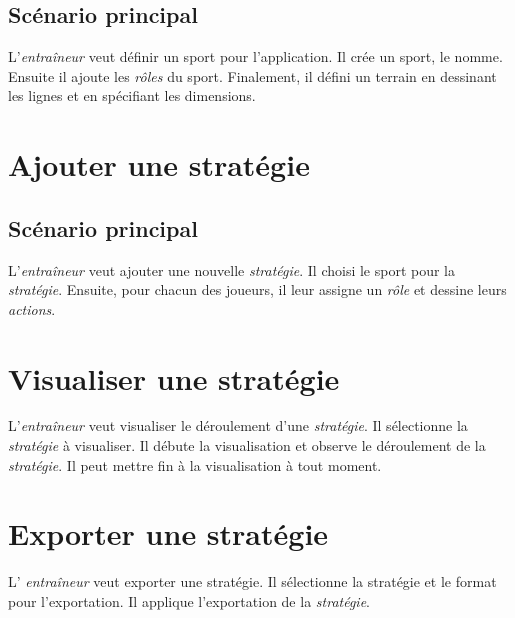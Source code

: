 \subsection{Sc\'enario principal}
\label{sub:sc'enario_principal}

L'\textit{entra\^ineur} veut définir un sport pour l'application.
Il cr\'ee un sport, le nomme.
Ensuite il ajoute les \textit{r\^oles} du sport.
Finalement, il d\'efini un terrain en dessinant les lignes et en sp\'ecifiant les dimensions.

\section{Ajouter une stratégie}
\label{sec:ajouter_une_strategie}

\subsection{Sc\'enario principal}
\label{sub:sc'enario_principal}

L'\textit{entraîneur} veut ajouter une nouvelle \textit{stratégie}.
Il choisi le sport pour la \textit{strat\'egie}.
Ensuite, pour chacun des joueurs, il leur assigne un \textit{r\^ole} et dessine leurs \textit{actions}.

\section{Visualiser une stratégie}
\label{sec:visualiser_une_strategie}

L'\textit{entra\^ineur} veut visualiser le d\'eroulement d'une \textit{strat\'egie}.
Il s\'electionne la \textit{strat\'egie} \`a visualiser.
Il d\'ebute la visualisation et observe le d\'eroulement de la \textit{strat\'egie}.
Il peut mettre fin \`a la visualisation \`a tout moment.

\section{Exporter une stratégie}
\label{sec:exporter_une_strategie}

L' \textit{entra\^ineur} veut exporter une strat\'egie.
Il s\'electionne la strat\'egie et le format pour l'exportation.
Il applique l'exportation de la \textit{strat\'egie}.

